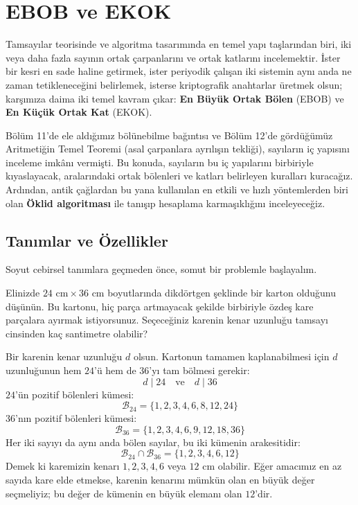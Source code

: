 \chapter[EBOB ve EKOK · \textit{Temel}]{EBOB ve EKOK}

Tamsayılar teorisinde ve algoritma tasarımında en temel yapı taşlarından biri, iki veya daha fazla sayının ortak çarpanlarını ve ortak katlarını incelemektir. İster bir kesri en sade haline getirmek, ister periyodik çalışan iki sistemin aynı anda ne zaman tetikleneceğini belirlemek, isterse kriptografik anahtarlar üretmek olsun; karşımıza daima iki temel kavram çıkar: \textbf{En Büyük Ortak Bölen} (EBOB) ve \textbf{En Küçük Ortak Kat} (EKOK).

Bölüm 11'de ele aldığımız bölünebilme bağıntısı ve Bölüm 12'de gördüğümüz Aritmetiğin Temel Teoremi (asal çarpanlara ayrılışın tekliği), sayıların iç yapısını inceleme imkânı vermişti. Bu konuda, sayıların bu iç yapılarını birbiriyle kıyaslayacak, aralarındaki ortak bölenleri ve katları belirleyen kuralları kuracağız. Ardından, antik çağlardan bu yana kullanılan en etkili ve hızlı yöntemlerden biri olan \textbf{Öklid algoritması} ile tanışıp hesaplama karmaşıklığını inceleyeceğiz.

\section{Tanımlar ve Özellikler}

Soyut cebirsel tanımlara geçmeden önce, somut bir problemle başlayalım.

Elinizde $24\text{ cm} \times 36\text{ cm}$ boyutlarında dikdörtgen şeklinde bir karton olduğunu düşünün. Bu kartonu, hiç parça artmayacak şekilde birbiriyle özdeş kare parçalara ayırmak istiyorsunuz. Seçeceğiniz karenin kenar uzunluğu tamsayı cinsinden kaç santimetre olabilir?

Bir karenin kenar uzunluğu $d$ olsun. Kartonun tamamen kaplanabilmesi için $d$ uzunluğunun hem $24$'ü hem de $36$'yı tam bölmesi gerekir:
\[ d \mid 24 \quad \text{ve} \quad d \mid 36 \]
$24$'ün pozitif bölenleri kümesi:
\[ \mathcal{B}_{24} = \{1, 2, 3, 4, 6, 8, 12, 24\} \]
$36$'nın pozitif bölenleri kümesi:
\[ \mathcal{B}_{36} = \{1, 2, 3, 4, 6, 9, 12, 18, 36\} \]
Her iki sayıyı da aynı anda bölen sayılar, bu iki kümenin arakesitidir:
\[ \mathcal{B}_{24} \cap \mathcal{B}_{36} = \{1, 2, 3, 4, 6, 12\} \]
Demek ki karemizin kenarı $1, 2, 3, 4, 6$ veya $12\text{ cm}$ olabilir. Eğer amacımız en az sayıda kare elde etmekse, karenin kenarını mümkün olan en büyük değer seçmeliyiz; bu değer de kümenin en büyük elemanı olan $12$'dir.

